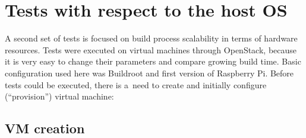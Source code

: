 \documentclass[printmode]{mgr}
\begin{document}













\section{Tests with respect to the host OS}

A second set of tests is focused on build process scalability in terms of hardware resources.
Tests were executed on virtual machines through OpenStack, because it is very easy to change their parameters and compare growing build time.
Basic configuration used here was Buildroot and first version of Raspberry Pi.
Before tests could be executed, there is a~need to create and initially configure (``provision'') virtual machine:

\subsection*{VM creation}
\end{document}
